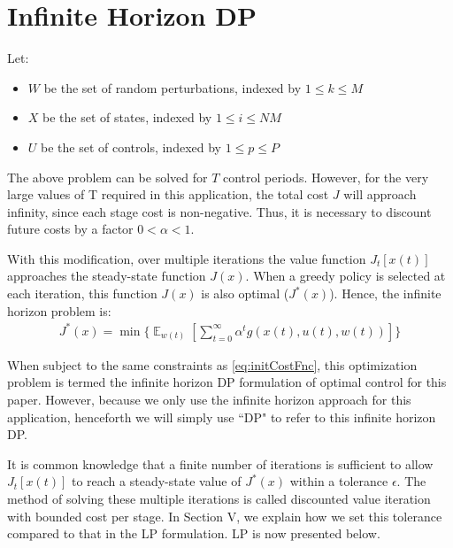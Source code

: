 \documentclass[conference]{IEEEtran}
\DeclareMathOperator{\E}{\mathbb{E}}
\begin{document}
\section{Infinite Horizon DP}
Let:
\begin{itemize}
	\item $W$ be the set of random perturbations, indexed by $1\leq k \leq M$
	\item $X$ be the set of states, indexed by $1\leq i \leq NM$
	\item $U$ be the set of controls, indexed by $1\leq p \leq P$
\end{itemize}


The above problem can be solved for $T$ control periods. However, for the very large values of T required in this application, the total cost $J$ will approach infinity, since each stage cost is non-negative. Thus, it is necessary to discount future costs by a factor $0<\alpha<1$.

With this modification, over multiple iterations the value function $J_{t}[x(t)]$ approaches the steady-state function $J(x)$. When a greedy policy is selected at each iteration, this function $J(x)$ is also optimal ($J^{*}(x)$). Hence, the infinite horizon problem is:
\begin{multline} \label{eq:DP}
J^{*}(x)= \min\Biggl\{\mathop{\E}_{w(t)}\left[\sum_{t=0}^{\infty}\alpha^{t}g(x(t),u(t),w(t))\right]\Biggr\}
\end{multline}

When subject to the same constraints as \eqref{eq:initCostFnc}, this optimization problem is termed the infinite horizon DP formulation of optimal control for this paper. However, because we only use the infinite horizon approach for this application, henceforth we will simply use ``DP" to refer to this infinite horizon DP.

It is common knowledge that a finite number of iterations is sufficient to allow $J_{t}[x(t)]$ to reach a steady-state value of $J^{*}(x)$ within a tolerance $\epsilon$. The method of solving these multiple iterations is called discounted value iteration with bounded cost per stage. In Section V, we explain how we set this tolerance compared to that in the LP formulation. LP is now presented below.

\end{document}

